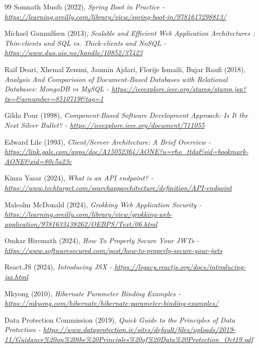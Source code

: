 \documentclass[]{final_report}
\begin{document}
\begin{thebibliography}{99}
 Somnath Musib (2022), 
\emph{Spring Boot in Practice - \url{https://learning.oreilly.com/library/view/spring-boot-in/9781617298813/}}

 Michael Gunnulfsen (2013),
\emph{Scalable and Efficient Web Application Architectures : Thin-clients and SQL vs. Thick-clients and NoSQL - \url{https://www.duo.uio.no/handle/10852/37423}}

 Raif Deari, Xhemal Zenuni, Jaumin Ajdari, Florije Ismaili, Bujar Raufi (2018),
\emph{Analysis And Comparision of Document-Based Databases with Relational Databases: MongoDB vs MySQL - \url{https://ieeexplore.ieee.org/stamp/stamp.jsp?tp=&arnumber=8510719&tag=1}}


 Gilda Pour (1998),
\emph{Component-Based Software Development Approach: Is It the Next Silver Bullet? - \url{https://ieeexplore.ieee.org/document/711055}}

 Edward Lile (1993),
\emph{Client/Server Architecture: A Brief Overview - \url{https://link.gale.com/apps/doc/A15052364/AONE?u=rho_ttda&sid=bookmark-AONE&xid=80c5a23c}}

 Kinza Yasar (2024),
\emph{What is an API endpoint? - \url{https://www.techtarget.com/searchapparchitecture/definition/API-endpoint}}

 Malcolm McDonald (2024),
\emph{Grokking Web Application Security - \url{https://learning.oreilly.com/library/view/grokking-web-application/9781633438262/OEBPS/Text/06.html}}

 Omkar Hiremath (2024),
\emph{How To Properly Secure Your JWTs - \url{https://www.softwaresecured.com/post/how-to-properly-secure-your-jwts}}

 React.JS (2024),
\emph{Introducing JSX - \url{https://legacy.reactjs.org/docs/introducing-jsx.html}}

 Mkyong (2010),
\emph{Hibernate Parameter Binding Examples - \url{https://mkyong.com/hibernate/hibernate-parameter-binding-examples/}}

 Data Protection Commission (2019),
\emph{Quick Guide to the Principles of Data Protection - \url{https://www.dataprotection.ie/sites/default/files/uploads/2019-11/Guidance\%20on\%20the\%20Principles\%20of\%20Data\%20Protection_Oct19.pdf}}


\end{thebibliography}
\end{document}
